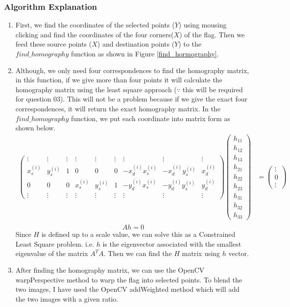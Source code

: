 \documentclass[a4paper]{article}
\begin{document}
\subsubsection*{Algorithm Explanation}
\begin{enumerate}
  \item First, we find the coordinates of the selected points ($Y$) using
   mousing clicking and find the coordinates of the four corners($X$) of
    the flag. Then we feed these source points ($X$) and destination points
     ($Y$) to the $find\_homography$ function as shown in Figure \ref{find_hormography}.
  \item Although, we only need four correspondences to find the
   homography matrix, in this function, if we give more than four
    points it will calculate the homography matrix using the least
     square approach  ($\because$ this will be required for question 03). This
      will not be a problem because if we give the exact four
       correspondences, it will return the exact homography matrix.
        In the $find\_homography$ function,
   we put each coordinate into matrix form as shown below.
   \begin{align*}
     \begin{pmatrix}
       \vdots & \vdots & \vdots & \vdots & \vdots & \vdots & \vdots & \vdots & \vdots\\
       x_s^{(i)} & y_s^{(i)} & 1 & 0 & 0 & 0 &-x_d^{(i)}x_s^{(i)} &-x_d^{(i)}y_s^{(i)} & x_d^{(i)}\\
       0 & 0 & 0 & x_s^{(i)} & y_s^{(i)} & 1 & -y_d^{(i)}x_s^{(i)} &-y_d^{(i)}y_s^{(i)} & y_d^{(i)}\\
       \vdots & \vdots & \vdots & \vdots & \vdots & \vdots & \vdots & \vdots & \vdots
     \end{pmatrix}
     \begin{pmatrix}
       h_{11} \\ h_{12} \\h_{13} \\ h_{21} \\ h_{22} \\ h_{23} \\ h_{31} \\ h_{32} \\ h_{33}
     \end{pmatrix}&=
     \begin{pmatrix}
       \vdots \\ 0 \\ \vdots
     \end{pmatrix}\\
   \end{align*}
   $$Ah=0$$
   Since $H$ is defined up to a scale value, we can solve
    this as a Constrained Least
     Square problem. i.e. $h$ is 
     the eigenvector associated with the smallest eigenvalue
      of the matrix $A^TA$. Then we can find the $H$ matrix using $h$ vector.
    \item After finding the homography matrix, we can use the
     OpenCV warpPerspective
      method to warp the flag into selected points.
       To blend the two images, I have used the OpenCV
        addWeighted method which will add the two images with
         a given ratio.
    \end{enumerate}
\end{document}

